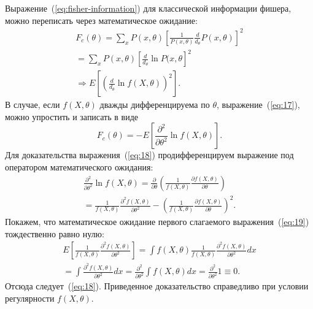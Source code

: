 Выражение~(\ref{eq:fisher-information}) для классической информации фишера, можно переписать через математическое ожидание:
\begin{multline}
    \label{eq:17}
        F_c(\theta) =
            \sum_x P(x, \theta)\left[\frac{1}{P(x,\theta)}\frac{d}{d_\theta} P(x, \theta)\right]^2 \\
                = \sum_x P(x,\theta)\left[\frac{d}{d_\theta}
                    \ln P(x,\theta \right]^2 \\
                    \Rightarrow E
                \left[\left(\frac{d}{d_\theta}\ln f(X,\theta)\right)^2
            \right].
\end{multline}
%
В случае, если $f(X,\theta)$ дважды дифференцируема по $\theta$,
выражение~(\ref{eq:17}), можно упростить и записать в виде
%
\begin{equation}\label{eq:18}
  F_c(\theta) = -E \left[\frac{\partial^2}{\partial \theta^2} \ln f(X,\theta)\right].
\end{equation}
%
Для доказательства выражения~(\ref{eq:18})
продифференцируем выражение под оператором математического ожидания:
%
\begin{multline}
    \label{eq:19}
        \frac{\partial^2}{\partial \theta^2}\ln f(X,\theta) =
            \frac{\partial}{\partial \theta}\left(\frac{1}{f(X,\theta)}
                \frac{\partial f(X,\theta)}{\partial \theta} \right) \\
            = \frac{1}{f(X,\theta)}\frac{\partial^2 f(X,\theta)}{\partial \theta^2} -
        \left(\frac{1}{f(X,\theta)} \frac{\partial f(X,\theta)}{\partial \theta}
    \right)^2.
\end{multline}
%
Покажем,
что математическое ожидание первого слагаемого выражения~(\ref{eq:19}) тождественно равно нулю:
%
\begin{multline}
    \label{eq:20}
        E\left[\frac{1}{f(X,\theta)}
            \frac{\partial^2 f(X,\theta)}{\partial \theta^2}\right] =
                \int f (X,\theta) \frac{1}{f(X,\theta)}
                    \frac{\partial^2 f(X, \theta)}{\partial \theta^2}dx \\
                        = \int \frac{\partial^2 f(X,\theta)}{\partial \theta^2}dx =
                    \frac{\partial^2}{\partial \theta^2} \int f(X,\theta)dx
                = \frac{\partial^2}{\partial \theta^2}1 \equiv 0.
\end{multline}
%
Отсюда следует~(\ref{eq:18}).
Приведенное доказательство справедливо при условии регулярности $f(X,\theta)$.


